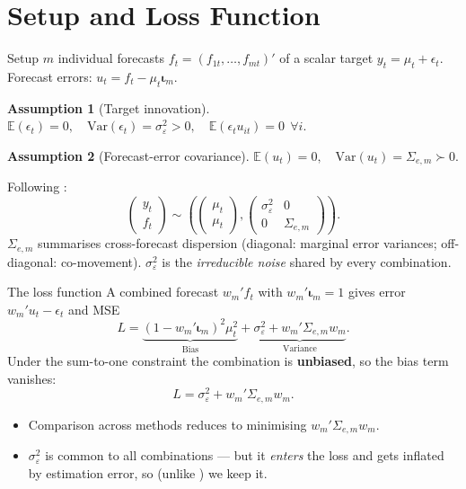 \documentclass[11pt,aspectratio=169]{beamer}
\newcommand{\Sig}{\Sigma_{e,m}}
\newcommand{\E}{\mathbb{E}}
\newcommand{\Var}{\mathrm{Var}}
\newcommand{\im}{\bm{\iota}_m}
\newtheorem{assumptionX}{Assumption}
\begin{document}
\section{Setup and Loss Function}

\begin{frame}{Setup}
  $m$ individual forecasts $f_t=(f_{1t},\dots,f_{mt})'$ of a scalar target
  $y_t=\mu_t+\epsilon_t$. Forecast errors: $u_t=f_t-\mu_t\im$.

  \begin{assumptionX}[Target innovation]
    $\E(\epsilon_t)=0,\quad \Var(\epsilon_t)=\sigma_\varepsilon^2>0,\quad
     \E(\epsilon_t u_{it})=0\ \ \forall i.$
  \end{assumptionX}
  \begin{assumptionX}[Forecast-error covariance]
    $\E(u_t)=0,\quad \Var(u_t)=\Sig\succ 0.$
  \end{assumptionX}

  Following \citet*{ElliottLiao2025}:
  \[
    \begin{pmatrix} y_t \\ f_t \end{pmatrix}
    \sim
    \left(
    \begin{pmatrix}\mu_t \\ \mu_t \end{pmatrix},
    \begin{pmatrix}\sigma_\varepsilon^2 & 0 \\ 0 & \Sig\end{pmatrix}
    \right).
  \]
  $\Sig$ summarises cross-forecast dispersion (diagonal: marginal error
  variances; off-diagonal: co-movement). $\sigma_\varepsilon^2$ is the
  \emph{irreducible noise} shared by every combination.
\end{frame}

\begin{frame}{The loss function}
  A combined forecast $w_m' f_t$ with $w_m'\im=1$ gives error
  $w_m'u_t-\epsilon_t$ and MSE
  \[
    L=\underbrace{(1-w_m'\im)^2\mu_t^2}_{\text{Bias}}
      +\underbrace{\sigma_\varepsilon^2+w_m'\Sig w_m}_{\text{Variance}}.
  \]
  Under the sum-to-one constraint the combination is \textbf{unbiased}, so
  the bias term vanishes:
  \[
    L=\sigma_\varepsilon^2+w_m'\Sig w_m .
  \]
  \begin{itemize}
    \item Comparison across methods reduces to minimising
      $w_m'\Sig w_m$.
    \item $\sigma_\varepsilon^2$ is common to all combinations --- but it
      \emph{enters} the loss and gets inflated by estimation error, so
      (unlike \citealp*{BootNibbering2019}) we keep it.
  \end{itemize}
\end{frame}
\end{document}
